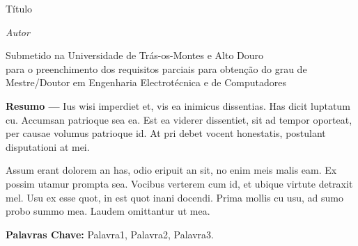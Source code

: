 

\begin{center}
\large{Título}

\vskip5mm
\normalsize{\textit{Autor}}


\vskip5mm
\small{Submetido na Universidade de Trás-os-Montes e Alto Douro \\
para o preenchimento dos requisitos parciais para obtenção do grau de \\
Mestre/Doutor em Engenharia Electrotécnica e de Computadores}
\end{center}

\textbf{Resumo ---} 
Ius wisi imperdiet et, vis ea inimicus dissentias. Has dicit luptatum cu. Accumsan patrioque sea ea. Est ea viderer dissentiet, sit ad tempor oporteat, per causae volumus patrioque id. At pri debet vocent honestatis, postulant disputationi at mei.

Assum erant dolorem an has, odio eripuit an sit, no enim meis malis eam. Ex possim utamur prompta sea. Vocibus verterem cum id, et ubique virtute detraxit mel. Usu ex esse quot, in est quot inani docendi. Prima mollis cu usu, ad sumo probo summo mea. Laudem omittantur ut mea.

\textbf{Palavras Chave:} Palavra1, Palavra2, Palavra3.

